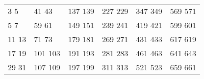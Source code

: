 \begin{center}
\footnotesize
\begin{longtable}{llllll}
3 5&41 43&137 139&227 229&347 349&569 571\\
5 7&59 61&149 151&239 241&419 421&599 601\\
11 13&71 73&179 181&269 271&431 433&617 619\\
17 19&101 103&191 193&281 283&461 463&641 643\\
29 31&107 109&197 199&311 313&521 523&659 661\\
\end{longtable}
\end{center}
\clearpage
